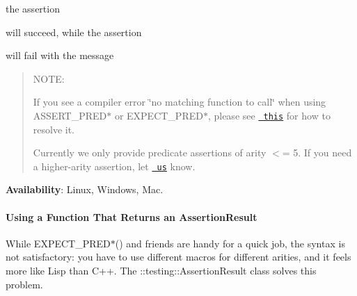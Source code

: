 the assertion


\begin{DoxyCode}{0}
\end{DoxyCode}


will succeed, while the assertion


\begin{DoxyCode}{0}
\end{DoxyCode}


will fail with the message


\begin{DoxyCode}{0}
\end{DoxyCode}


\begin{quote}
N\+O\+TE\+:


\begin{DoxyEnumerate}
\item If you see a compiler error \char`\"{}no matching function to call\char`\"{} when using {\ttfamily A\+S\+S\+E\+R\+T\+\_\+\+P\+R\+E\+D$\ast$} or {\ttfamily E\+X\+P\+E\+C\+T\+\_\+\+P\+R\+E\+D$\ast$}, please see \href{faq.md\#OverloadedPredicate}{\texttt{ this}} for how to resolve it.
\end{DoxyEnumerate}
\begin{DoxyEnumerate}
\item Currently we only provide predicate assertions of arity $<$= 5. If you need a higher-\/arity assertion, let \href{https://github.com/google/googletest/issues}{\texttt{ us}} know. 
\end{DoxyEnumerate}\end{quote}


{\bfseries{Availability}}\+: Linux, Windows, Mac.

\paragraph*{Using a Function That Returns an Assertion\+Result}

While {\ttfamily E\+X\+P\+E\+C\+T\+\_\+\+P\+R\+E\+D$\ast$()} and friends are handy for a quick job, the syntax is not satisfactory\+: you have to use different macros for different arities, and it feels more like Lisp than C++. The {\ttfamily \+::testing\+::\+Assertion\+Result} class solves this problem.

